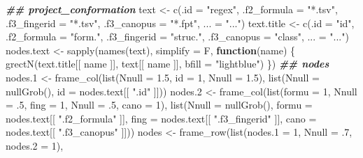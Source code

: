 \documentclass[
]{article}
\newenvironment{Shaded}{\begin{snugshade}}{\end{snugshade}}
\newcommand{\AttributeTok}[1]{\textcolor[rgb]{0.77,0.63,0.00}{#1}}
\newcommand{\ControlFlowTok}[1]{\textcolor[rgb]{0.13,0.29,0.53}{\textbf{#1}}}
\newcommand{\DecValTok}[1]{\textcolor[rgb]{0.00,0.00,0.81}{#1}}
\newcommand{\DocumentationTok}[1]{\textcolor[rgb]{0.56,0.35,0.01}{\textbf{\textit{#1}}}}
\newcommand{\FloatTok}[1]{\textcolor[rgb]{0.00,0.00,0.81}{#1}}
\newcommand{\FunctionTok}[1]{\textcolor[rgb]{0.00,0.00,0.00}{#1}}
\newcommand{\NormalTok}[1]{#1}
\newcommand{\OtherTok}[1]{\textcolor[rgb]{0.56,0.35,0.01}{#1}}
\newcommand{\StringTok}[1]{\textcolor[rgb]{0.31,0.60,0.02}{#1}}
\begin{document}
\begin{Shaded}
\begin{Highlighting}[]
\DocumentationTok{\#\# project\_conformation}
\NormalTok{text }\OtherTok{\textless{}{-}} \FunctionTok{c}\NormalTok{(}\AttributeTok{.id =} \StringTok{"regex"}\NormalTok{, }\AttributeTok{.f2\_formula =} \StringTok{"*.tsv"}\NormalTok{, }\AttributeTok{.f3\_fingerid =} \StringTok{"*.tsv"}\NormalTok{, }
          \AttributeTok{.f3\_canopus =} \StringTok{"*.fpt"}\NormalTok{, }\AttributeTok{... =} \StringTok{"..."}\NormalTok{)}
\NormalTok{text.title }\OtherTok{\textless{}{-}} \FunctionTok{c}\NormalTok{(}\AttributeTok{.id =} \StringTok{"id"}\NormalTok{, }\AttributeTok{.f2\_formula =} \StringTok{"form."}\NormalTok{, }\AttributeTok{.f3\_fingerid =} \StringTok{"struc."}\NormalTok{,}
                \AttributeTok{.f3\_canopus =} \StringTok{"class"}\NormalTok{, }\AttributeTok{... =} \StringTok{"..."}\NormalTok{)}
\NormalTok{nodes.text }\OtherTok{\textless{}{-}} \FunctionTok{sapply}\NormalTok{(}\FunctionTok{names}\NormalTok{(text), }\AttributeTok{simplify =}\NormalTok{ F,}
                     \ControlFlowTok{function}\NormalTok{(name) \{}
                       \FunctionTok{grectN}\NormalTok{(text.title[[ name ]], text[[ name ]], }\AttributeTok{bfill =} \StringTok{"lightblue"}\NormalTok{)}
\NormalTok{                     \})}
\DocumentationTok{\#\# nodes}
\NormalTok{nodes}\FloatTok{.1} \OtherTok{\textless{}{-}} \FunctionTok{frame\_col}\NormalTok{(}\FunctionTok{list}\NormalTok{(}\AttributeTok{Nnull =} \FloatTok{1.5}\NormalTok{, }\AttributeTok{id =} \DecValTok{1}\NormalTok{, }\AttributeTok{Nnull =} \FloatTok{1.5}\NormalTok{),}
                     \FunctionTok{list}\NormalTok{(}\AttributeTok{Nnull =} \FunctionTok{nullGrob}\NormalTok{(), }\AttributeTok{id =}\NormalTok{ nodes.text[[ }\StringTok{".id"}\NormalTok{ ]]))}
\NormalTok{nodes}\FloatTok{.2} \OtherTok{\textless{}{-}} \FunctionTok{frame\_col}\NormalTok{(}\FunctionTok{list}\NormalTok{(}\AttributeTok{formu =} \DecValTok{1}\NormalTok{, }\AttributeTok{Nnull =}\NormalTok{ .}\DecValTok{5}\NormalTok{, }\AttributeTok{fing =} \DecValTok{1}\NormalTok{, }\AttributeTok{Nnull =}\NormalTok{ .}\DecValTok{5}\NormalTok{, }\AttributeTok{cano =} \DecValTok{1}\NormalTok{),}
                     \FunctionTok{list}\NormalTok{(}\AttributeTok{Nnull =} \FunctionTok{nullGrob}\NormalTok{(), }\AttributeTok{formu =}\NormalTok{ nodes.text[[ }\StringTok{".f2\_formula"}\NormalTok{ ]],}
                          \AttributeTok{fing =}\NormalTok{ nodes.text[[ }\StringTok{".f3\_fingerid"}\NormalTok{ ]],}
                          \AttributeTok{cano =}\NormalTok{ nodes.text[[ }\StringTok{".f3\_canopus"}\NormalTok{ ]]))}
\NormalTok{nodes }\OtherTok{\textless{}{-}} \FunctionTok{frame\_row}\NormalTok{(}\FunctionTok{list}\NormalTok{(}\AttributeTok{nodes.1 =} \DecValTok{1}\NormalTok{, }\AttributeTok{Nnull =}\NormalTok{ .}\DecValTok{7}\NormalTok{, }\AttributeTok{nodes.2 =} \DecValTok{1}\NormalTok{),}

\end{Highlighting}
\end{Shaded}
\end{document}
